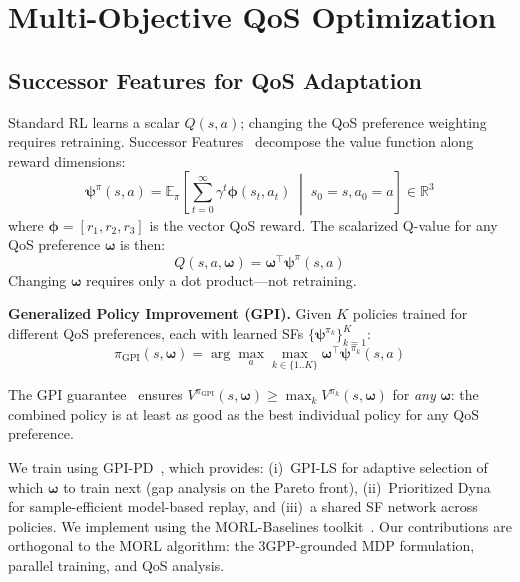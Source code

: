 \documentclass[conference]{IEEEtran}
\newcommand{\vomega}{\boldsymbol{\omega}}
\newcommand{\vpsi}{\boldsymbol{\psi}}
\newcommand{\Real}{\mathbb{R}}
\begin{document}
\section{Multi-Objective QoS Optimization}\label{sec:method}

\subsection{Successor Features for QoS Adaptation}\label{sec:sf}

Standard RL learns a scalar $Q(s,a)$; changing the QoS preference weighting requires retraining.
Successor Features~\cite{barreto2017} decompose the value function along reward dimensions:
\begin{equation}
\vpsi^\pi(s,a) = \mathbb{E}_\pi\!\left[\sum_{t=0}^{\infty} \gamma^t \boldsymbol{\phi}(s_t, a_t) \;\middle|\; s_0{=}s, a_0{=}a \right] \in \Real^3
\label{eq:sf}
\end{equation}
where $\boldsymbol{\phi} = [r_1, r_2, r_3]$ is the vector QoS reward.
The scalarized Q-value for any QoS preference $\vomega$ is then:
\begin{equation}
Q(s,a,\vomega) = \vomega^\top \vpsi^\pi(s,a)
\label{eq:q_sf}
\end{equation}
Changing $\vomega$ requires only a dot product---not retraining.

\textbf{Generalized Policy Improvement (GPI).}
Given $K$ policies trained for different QoS preferences, each with learned SFs $\{\vpsi^{\pi_k}\}_{k=1}^K$:
\begin{equation}
\pi_\text{GPI}(s, \vomega) = \arg\max_a \max_{k \in \{1..K\}} \vomega^\top \vpsi^{\pi_k}(s, a)
\label{eq:gpi}
\end{equation}

The GPI guarantee~\cite{barreto2017} ensures $V^{\pi_\text{GPI}}(s,\vomega) \geq \max_k V^{\pi_k}(s,\vomega)$ for \emph{any} $\vomega$: the combined policy is at least as good as the best individual policy for any QoS preference.

We train using GPI-PD~\cite{gpipd}, which provides: (i)~GPI-LS for adaptive selection of which $\vomega$ to train next (gap analysis on the Pareto front), (ii)~Prioritized Dyna for sample-efficient model-based replay, and (iii)~a shared SF network across policies.
We implement using the MORL-Baselines toolkit~\cite{morlbaselines}.
Our contributions are orthogonal to the MORL algorithm: the 3GPP-grounded MDP formulation, parallel training, and QoS analysis.
\end{document}
